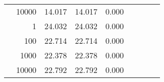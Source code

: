 \begin{table}
\begin{tabular}{rrrrrrrrr}
	            
					 &  
					 
					\multirow{ 1 }{*}{ 10000 } &
					
						
							    
							    
	                           14.017 & 14.017 & 0.000  \\
	                
	            
	        
				\noalign{\smallskip}\hline
				\multirow{ 4 }{*}{ 2000000 } &
				
					
					 
					\multirow{ 1 }{*}{ 1 } &
					
						
							    
							    
	                           24.032 & 24.032 & 0.000  \\
	                
	            
					 &  
					 
					\multirow{ 1 }{*}{ 100 } &
					
						
							    
							    
	                           22.714 & 22.714 & 0.000  \\
	                
	            
					 &  
					 
					\multirow{ 1 }{*}{ 1000 } &
					
						
							    
							    
	                           22.378 & 22.378 & 0.000  \\
	                
	            
					 &  
					 
					\multirow{ 1 }{*}{ 10000 } &
					
						
							    
							    
	                           22.792 & 22.792 & 0.000  \\
	                
	            
	        

\hline

\end{tabular}
\end{table}
\clearpage


	    
	
	    

